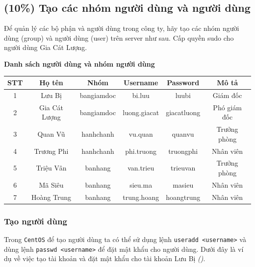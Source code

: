 \subsection{(10\%) Tạo các nhóm người dùng và người dùng}

Để quản lý các bộ phận và người dùng trong công ty, hãy tạo các nhóm
người dùng (group) và người dùng (user) trên server như sau.
Cấp quyền sudo cho người dùng Gia Cát Lượng.

\begin{minipage}{.93\linewidth}
  \centering
  \captionsetup{type=table}
  \caption{\bfseries Danh sách người dùng và nhóm người dùng}
  {\small
    \begin{tabular}{| c | c | c | c | c | c |}
      \hline
      \textbf{STT} & \textbf{Họ tên} & \textbf{Nhóm} & \textbf{Username} & \textbf{Password} & \textbf{Mô tả} \\\hline
      1            & Lưu Bị          & bangiamdoc    & bi.luu            & luubi             & Giám đốc       \\\hline
      2            & Gia Cát Lượng   & bangiamdoc    & luong.giacat      & giacatluong       & Phó giám đốc   \\\hline
      3            & Quan Vũ         & hanhchanh     & vu.quan           & quanvu            & Trưởng phòng   \\\hline
      4            & Trương Phi      & hanhchanh     & phi.truong        & truongphi         & Nhân viên      \\\hline
      5            & Triệu Vân       & banhang       & van.trieu         & trieuvan          & Trưởng phòng   \\\hline
      6            & Mã Siêu         & banhang       & sieu.ma           & masieu            & Nhân viên      \\\hline
      7            & Hoàng Trung     & banhang       & trung.hoang       & hoangtrung        & Nhân viên      \\\hline
    \end{tabular}
  }
\end{minipage}

\subsubsection{Tạo người dùng}

Trong \texttt{CentOS} để tạo người dùng ta có thể sử dụng lệnh
\texttt{useradd <username>} và dùng lệnh \texttt{passwd <username>}
để đặt mật khẩu cho người dùng. Dưới đây là ví dụ về việc tạo tài khoản
và đặt mật khẩu cho tài khoản Lưu Bị \textit{()}.

